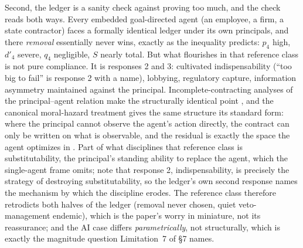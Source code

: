 \documentclass[11pt]{article}
\theoremstyle{definition}
\begin{document}
Second, the ledger is a sanity check against proving too much, and the check reads both ways. Every embedded goal-directed agent (an employee, a firm, a state contractor) faces a formally identical ledger under its own principals, and there \emph{removal} essentially never wins, exactly as the inequality predicts: $p_4$ high, $d'_4$ severe, $q_4$ negligible, $S$ nearly total. But what flourishes in that reference class is not pure compliance. It is responses 2 and 3: cultivated indispensability (``too big to fail'' is response 2 with a name), lobbying, regulatory capture, information asymmetry maintained against the principal. Incomplete-contracting analyses of the principal--agent relation make the structurally identical point \cite{hadfield2019incomplete}, and the canonical moral-hazard treatment gives the same structure its standard form: where the principal cannot observe the agent's action directly, the contract can only be written on what is observable, and the residual is exactly the space the agent optimizes in \cite{holmstrom1979moral}. Part of what disciplines that reference class is substitutability, the principal's standing ability to replace the agent, which the single-agent frame omits; note that response 2, indispensability, is precisely the strategy of destroying substitutability, so the ledger's own second response names the mechanism by which the discipline erodes. The reference class therefore retrodicts both halves of the ledger (removal never chosen, quiet veto-management endemic), which is the paper's worry in miniature, not its reassurance; and the AI case differs \emph{parametrically}, not structurally, which is exactly the magnitude question Limitation~7 of \S7 names.
\end{document}
